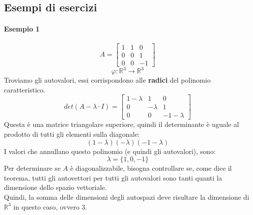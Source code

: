 \documentclass[12pt,a4paper]{article}
\begin{document}
\subsection{Esempi di esercizi}
\paragraph{Esempio 1}
\[
A = \begin{bmatrix}
  1 & 1 & 0\\
  0 & 0 & 1\\
  0 & 0 & -1
\end{bmatrix}
\]
\[
\varphi:\mathbb{R}^3 \to \mathbb{R}^3
\]
Troviamo gli autovalori, essi corrispondono alle \textbf{radici} del polinomio caratteristico.\\
\[
det(A - \lambda \cdot I) = \begin{bmatrix}
  1-\lambda & 1 & 0\\
  0 & -\lambda & 1\\
  0 & 0 & -1 - \lambda
\end{bmatrix}
\]
Questa è una matrice triangolare superiore, quindi il determinante è uguale al prodotto di tutti gli elementi sulla diagonale:
\[
(1-\lambda)(-\lambda)(-1-\lambda)
\]
I valori che annullano questo polinomio (e quindi gli autovalori), sono:
\[
\lambda = \{1,0,-1\}
\]
Per determinare se $A$ è diagonalizzabile, bisogna controllare se, come dice il teorema, tutti gli autovettori per tutti gli autovalori sono tanti quanti la dimensione dello spazio vettoriale.\\
Quindi, la somma delle dimensioni degli autospazi deve risultare la dimensione di $\mathbb{R}^3$ in questo caso, ovvero $3$.
\end{document}
